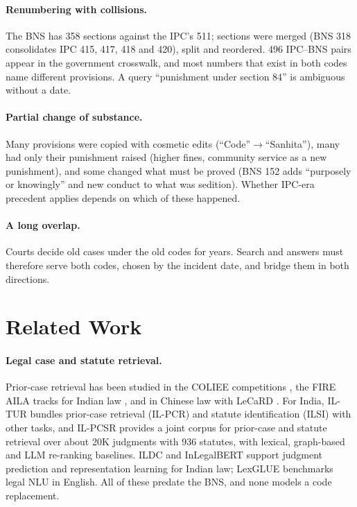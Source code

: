 \documentclass[sigconf,nonacm]{acmart}
\begin{document}
\paragraph{Renumbering with collisions.} The BNS has 358 sections against the IPC's 511; sections
were merged (BNS 318 consolidates IPC 415, 417, 418 and 420), split and reordered. 496 IPC--BNS
pairs appear in the government crosswalk, and most numbers that exist in both codes name different
provisions. A query ``punishment under section 84'' is ambiguous without a date.

\paragraph{Partial change of substance.} Many provisions were copied with cosmetic edits
(``Code''$\to$``Sanhita''), many had only their punishment raised (higher fines, community
service as a new punishment), and some changed what must be proved (BNS 152 adds ``purposely or
knowingly'' and new conduct to what was sedition). Whether IPC-era precedent applies depends on
which of these happened.

\paragraph{A long overlap.} Courts decide old cases under the old codes for years. Search and
answers must therefore serve both codes, chosen by the incident date, and bridge them in both
directions.

\section{Related Work}\label{sec:related}

\paragraph{Legal case and statute retrieval.} Prior-case retrieval has been studied in the COLIEE
competitions \cite{coliee}, the FIRE AILA tracks for Indian law \cite{aila2019}, and in Chinese
law with LeCaRD \cite{lecard}. For India, IL-TUR \cite{iltur} bundles prior-case retrieval
(IL-PCR) and statute identification (ILSI) with other tasks, and IL-PCSR \cite{ilpcsr} provides a
joint corpus for prior-case and statute retrieval over about 20K judgments with 936 statutes, with
lexical, graph-based and LLM re-ranking baselines. ILDC \cite{ildc} and InLegalBERT
\cite{inlegalbert} support judgment prediction and representation learning for Indian law;
LexGLUE \cite{lexglue} benchmarks legal NLU in English. All of these predate the BNS, and none
models a code replacement.
\end{document}
